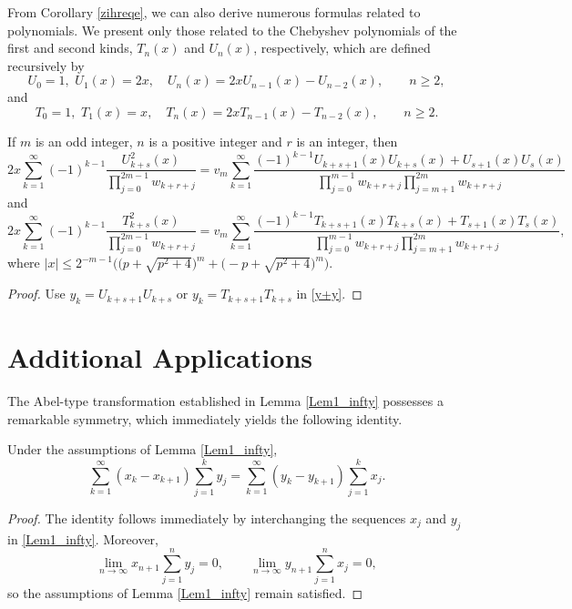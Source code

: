 \documentclass[12pt,reqno]{article}
\begin{document}
From Corollary \ref{zihreqe}, we can also derive numerous formulas related to polynomials. We present only those related to the Chebyshev polynomials of the first and second kinds, $T_n(x)$ and $U_n
(x)$, respectively, which are defined recursively by
	\begin{equation*}
	U_0=1,\,\, U_1(x)=2x,\quad U_n(x)=2xU_{n-1}(x)-U_{n-2}(x),\qquad n\geq2,
	\end{equation*}
and
	\begin{equation*}
	T_0=1,\,\, T_1(x)=x,\quad T_n(x)=2xT_{n-1}(x)-T_{n-2}(x),\qquad n\geq2.
	\end{equation*}
\begin{proposition}
	If $m$ is an odd integer, $n$ is a positive integer and $r$ is an integer, then
		\begin{equation*}
		2x\sum_{k = 1}^\infty (-1)^{k-1}  \frac{U^2_{k+s}(x)}{\prod\limits_{j = 0}^{2m - 1} w_{k + r + j}}  =  v_m \sum_{k = 1}^\infty \frac{(-1)^{k-1}U_{k+s+1}(x)U_{k+s}(x) + U_{s+1}(x)U_{s}(x)}{\prod\limits_{j = 0}^{m - 1} w_{k + r + j}  \prod\limits_{j = m + 1}^{2m} w_{k + r + j}}
		\end{equation*}
and
	\begin{equation*}
		2x\sum_{k = 1}^\infty (-1)^{k-1}  \frac{T^2_{k+s}(x)}{\prod\limits_{j = 0}^{2m - 1} w_{k + r + j}}  =  v_m \sum_{k = 1}^\infty \frac{(-1)^{k-1}T_{k+s+1}(x)T_{k+s}(x) + T_{s+1}(x)T_{s}(x)}{\prod\limits_{j = 0}^{m - 1} w_{k + r + j}  \prod\limits_{j = m + 1}^{2m} w_{k + r + j}},
		\end{equation*}
where 
	$|x|\le 2^{-m-1}\Big(\big(p+\sqrt{p^2+4}\big)^m+\big(-p+\sqrt{p^2+4}\big)^{m}\Big)$.
\end{proposition}
\begin{proof}
	Use $y_k=U_{k+s+1}U_{k+s}$ or $y_k=T_{k+s+1}T_{k+s}$ in \eqref{y+y}.
\end{proof}


\section{Additional Applications}


The Abel-type transformation established in Lemma \ref{Lem1_infty} possesses a remarkable symmetry, which immediately yields the following identity.
\begin{proposition}\label{new}
	Under the assumptions of Lemma \ref{Lem1_infty},
	\begin{equation}\label{einzt6m}
	\sum_{k=1}^{\infty}
	\left(x_k-x_{k+1}\right)
	\sum_{j=1}^{k}y_j
	=
	\sum_{k=1}^{\infty}
	\left(y_k-y_{k+1}\right)
	\sum_{j=1}^{k}x_j.
	\end{equation}
\end{proposition}
\begin{proof}
	The identity follows immediately by interchanging the sequences
	\(x_j\) and \(y_j\) in \eqref{Lem1_infty}. Moreover,
	\[
	\lim_{n\to\infty}
	x_{n+1}\sum_{j=1}^{n}y_j=0,
	\qquad
	\lim_{n\to\infty}
	y_{n+1}\sum_{j=1}^{n}x_j=0,
	\]
	so the assumptions of Lemma \ref{Lem1_infty} remain satisfied.
\end{proof}
\end{document}
